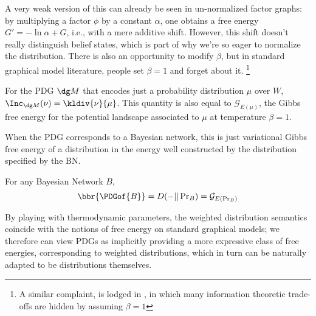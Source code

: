 A very weak version of this can already be seen in un-normalized factor graphs: by multiplying a factor $\phi$ by a constant $\alpha$, one obtains a free energy $G' = - \ln \alpha + G$, i.e., with a mere additive shift. However, this shift doesn't really distinguish belief states, which is part of why we're so eager to normalize the distribution.
There is also an opportunity to modify $\beta$, but in standard graphical model literature, people set $\beta = 1$ and forget about it.%
	\footnote{A similar complaint, is lodged in \cite{fixing-broken-elbo}, in which many information theoretic trade-offs are hidden by assuming $\beta = 1$}


\begin{example}%
	\label{ex:energy-from-distrib}
	For the PDG $\dg M$ that encodes just a probability
			distribution $\mu$ over $W$,  $\Inc_{\dg M}(\nu) = \kldiv{\nu}{\mu}$. This quantity is also equal to $\mathcal G_{E(\mu)}$, the Gibbs free energy for the potential landscape associated to $\mu$ at temperature $\beta = 1$.
\end{example}


When the PDG corresponds to a Bayesian network, this is just variational Gibbs free energy of a distribution in the energy well constructed by the distribution specified by the BN.

\begin{prop}\label{prop:bn-free-energy}
	For any Bayesian Network $B$, 
	\[ \bbr{\PDGof{B}} = D(- || \Pr\nolimits_B) = \mathcal G_{E(\Pr_B)} \]
\end{prop}

By playing with thermodynamic parameters, the weighted distribution semantics coincide with the notions of free energy on standard graphical models; we therefore can view PDGs as implicitly providing a more expressive class of free energies, corresponding to weighted distributions, which in turn can be naturally adapted to be distributions themselves.



